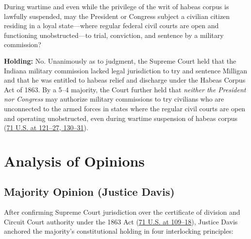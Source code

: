\documentclass[12pt]{article}
\begin{document}
During wartime and even while the privilege of the writ of habeas corpus is lawfully suspended, may the President or Congress subject a civilian citizen residing in a loyal state---where regular federal civil courts are open and functioning unobstructed---to trial, conviction, and sentence by a military commission?

\textbf{Holding:} No. Unanimously as to judgment, the Supreme Court held that the Indiana military commission lacked legal jurisdiction to try and sentence Milligan and that he was entitled to habeas relief and discharge under the Habeas Corpus Act of 1863. By a 5--4 majority, the Court further held that \textit{neither the President nor Congress} may authorize military commissions to try civilians who are unconnected to the armed forces in states where the regular civil courts are open and operating unobstructed, even during wartime suspension of habeas corpus (\href{https://supreme.justia.com/cases/federal/us/71/2/}{71 U.S. at 121--27, 130--31}).

\section{Analysis of Opinions}
\subsection{Majority Opinion (Justice Davis)}

After confirming Supreme Court jurisdiction over the certificate of division and Circuit Court authority under the 1863 Act (\href{https://supreme.justia.com/cases/federal/us/71/2/}{71 U.S. at 109--18}), Justice Davis anchored the majority's constitutional holding in four interlocking principles:
\end{document}

